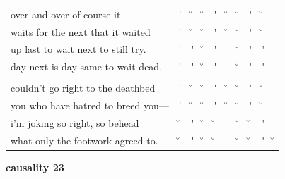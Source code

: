 \documentclass[12pt, landscape]{article}
\begin{document}
\begin{center}
\begin{tabularx}{\textwidth}{
>{\lefting\arraybackslash}X
c
c
c
c
c
c
c
c
c
}

over and over of course it & \'{} & \u{} & \u{} & \'{} & \u{} & \u{} & \'{} & \u{} & \\
waits for the next that it waited & \'{} & \u{} & \u{} & \'{} & \u{} & \u{} & \'{} & \u{} & \\
up last to wait next to still try. & \'{} & \'{} & \u{} & \'{} & \'{} & \u{} & \'{} & \'{} & \\
day next is day same to wait dead. & \'{} & \'{} & \u{} & \'{} & \'{} & \u{} & \'{} & \'{} & \\
 & & & & & & & & \\
couldn't go right to the deathbed & \'{} & \u{} & \u{} & \'{} & \u{} & \u{} & \'{} & \u{} & \\
you who have hatred to breed you--- & \'{} & \u{} & \u{} & \'{} & \u{} & \u{} & \'{} & \u{} & \\
i'm joking so right, so behead & \u{} & \'{} & \u{} & \u{} & \'{} & \u{} & \u{} & \'{} & \\
what only the footwork agreed to. & \u{} & \'{} & \u{} & \u{} & \'{} & \u{} & \u{} & \'{} & \u{} \\

\end{tabularx}
\end{center}

\vspace*{\fill}

\newpage

\vspace*{\fill}

\noindent \textbf{causality 23}
\noindent \hfill \par
\end{document}
